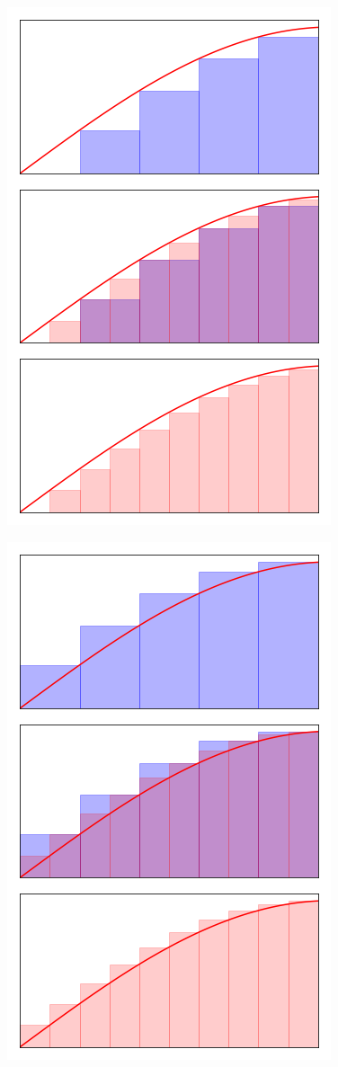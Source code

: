 \begin{figure}[H]
\centering
\begin{minipage}{.5\textwidth}
  \centering
  \includegraphics[scale=0.5]{Code/Area1.png}
  \label{fig:test1}
\end{minipage}%
\begin{minipage}{.5\textwidth}
  \centering
  \includegraphics[scale=0.5]{Code/Area2.png}

\end{minipage}
\end{figure}
